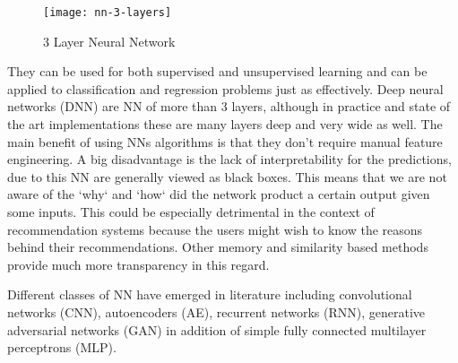 \begin{figure}[h!]
    \texttt{[image: nn-3-layers]}
    \caption{3 Layer Neural Network}
\end{figure}

They can be used for both supervised and unsupervised learning and can be applied to classification and regression problems just as effectively. Deep neural networks (DNN) are NN of more than 3 layers, although in practice and state of the art implementations these are many layers deep and very wide as well. The main benefit of using NNs algorithms is that they don't require manual feature engineering.
A big disadvantage is the lack of interpretability for the predictions, due to this NN are generally viewed as black boxes. This means that we are not aware of the `why` and `how` did the network product a certain output given some inputs. This could be especially detrimental in the context of recommendation systems because the users might wish to know the reasons behind their recommendations. Other memory and similarity based methods provide much more transparency in this regard.

Different classes of NN have emerged in literature including convolutional networks (CNN), autoencoders (AE), recurrent networks (RNN), generative adversarial networks (GAN) in addition of simple fully connected multilayer perceptrons (MLP).
